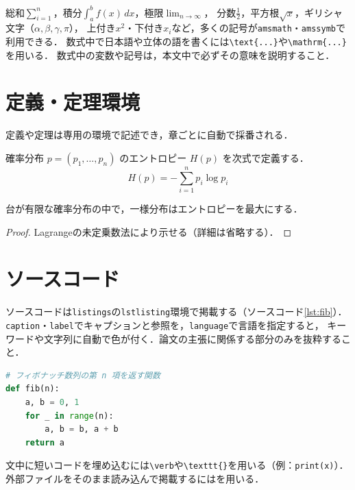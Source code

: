 総和$\sum_{i=1}^{n}$，積分$\int_a^b f(x)\,dx$，極限$\lim_{n\to\infty}$，
分数$\frac{1}{2}$，平方根$\sqrt{x}$，ギリシャ文字（$\alpha, \beta, \gamma, \pi$），
上付き$x^2$・下付き$x_i$など，多くの記号が\texttt{amsmath}・\texttt{amssymb}で利用できる．
数式中で日本語や立体の語を書くには\verb|\text{...}|や\verb|\mathrm{...}|を用いる．
数式中の変数や記号は，本文中で必ずその意味を説明すること．

\section{定義・定理環境}
\label{sec:theorem}
定義や定理は専用の環境で記述でき，章ごとに自動で採番される．

\begin{definition}[エントロピー]
    確率分布 $p = (p_1, \dots, p_n)$ のエントロピー $H(p)$ を次式で定義する．
    \begin{equation}
        H(p) = -\sum_{i=1}^{n} p_i \log p_i
    \end{equation}
\end{definition}

\begin{theorem}
    台が有限な確率分布の中で，一様分布はエントロピーを最大にする．
\end{theorem}
\begin{proof}
    Lagrangeの未定乗数法により示せる（詳細は省略する）．
\end{proof}

\section{ソースコード}
\label{sec:code}
ソースコードは\texttt{listings}の\texttt{lstlisting}環境で掲載する（ソースコード\ref{lst:fib}）．
\verb|caption|・\verb|label|でキャプションと参照を，\verb|language|で言語を指定すると，
キーワードや文字列に自動で色が付く．論文の主張に関係する部分のみを抜粋すること．

\begin{lstlisting}[caption={Pythonによる例}, label={lst:fib}, language=Python, float=tb]
# フィボナッチ数列の第 n 項を返す関数
def fib(n):
    a, b = 0, 1
    for _ in range(n):
        a, b = b, a + b
    return a
\end{lstlisting}

文中に短いコードを埋め込むには\verb|\verb|や\verb|\texttt{}|を用いる（例：\verb|print(x)|）．
外部ファイルをそのまま読み込んで掲載するには\verb||を用いる．

